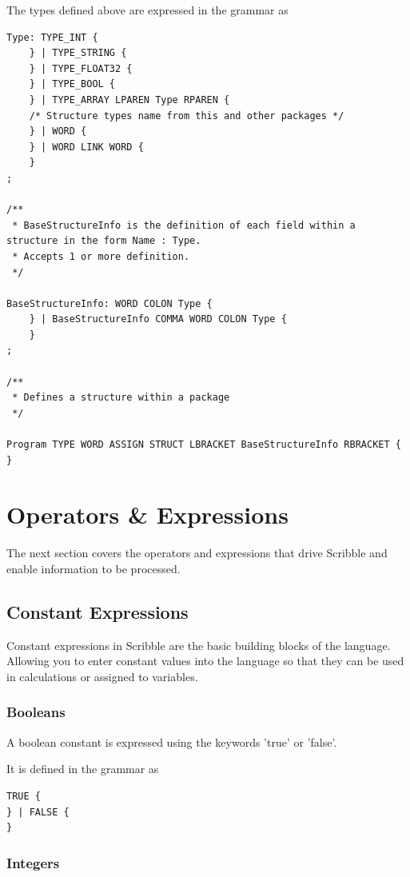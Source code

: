 \documentclass[]{final_report}
\begin{document}
The types defined above are expressed in the grammar as
\begin{verbatim}
Type: TYPE_INT {
	} | TYPE_STRING {
	} | TYPE_FLOAT32 {
	} | TYPE_BOOL {
	} | TYPE_ARRAY LPAREN Type RPAREN {
	/* Structure types name from this and other packages */	
	} | WORD {
	} | WORD LINK WORD {
	}
;

/**
 * BaseStructureInfo is the definition of each field within a structure in the form Name : Type.
 * Accepts 1 or more definition.
 */

BaseStructureInfo: WORD COLON Type {		
	} | BaseStructureInfo COMMA WORD COLON Type {
	}
;

/**
 * Defines a structure within a package
 */
 
Program TYPE WORD ASSIGN STRUCT LBRACKET BaseStructureInfo RBRACKET {
}

\end{verbatim}

\section{Operators \& Expressions}

The next section covers the operators and expressions that drive Scribble and enable information to be processed.

\subsection{Constant Expressions}

Constant expressions in Scribble are the basic building blocks of the language. Allowing you to enter constant values into the language so that they can be used in calculations or assigned to variables.

\subsubsection{Booleans}

A boolean constant is expressed using the keywords 'true' or 'false'.

It is defined in the grammar as
\begin{verbatim}
TRUE {
} | FALSE {
}\end{verbatim}

\subsubsection{Integers}
\end{document}
